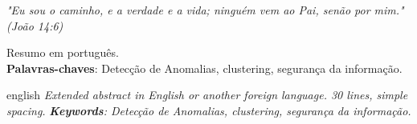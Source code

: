 \documentclass[12pt,openright,oneside,a4paper,english,spanish,brazil]{unifil}
\begin{document}
\begin{epigrafe}
\vspace*{\fill}
\begin{flushright}
\textit{"Eu sou o caminho, e a verdade e a vida; ninguém vem ao Pai, senão por mim." \\
(João 14:6)}
\end{flushright}
\end{epigrafe}

\par
\begin{resumo}
Resumo em português.
\vspace{\onelineskip} \\
\noindent
\textbf{Palavras-chaves}: Detecção de Anomalias, clustering, segurança da informação.
\end{resumo}

\par
\begin{resumo}[Abstract]
\begin{otherlanguage*}{english}
\emph{
Extended abstract in English or another foreign language. 30 lines, simple spacing.
}
\vspace{\onelineskip}
\noindent
\emph{	
\textbf{Keywords}: Detecção de Anomalias, clustering, segurança da informação.}
\end{otherlanguage*}
\end{resumo}


\tableofcontents*

  \setlength\absleftindent{0cm}
  \setlength\absrightindent{0cm}
  
  \abstracttextfont{\normalfont\normalsize}
\end{document}
